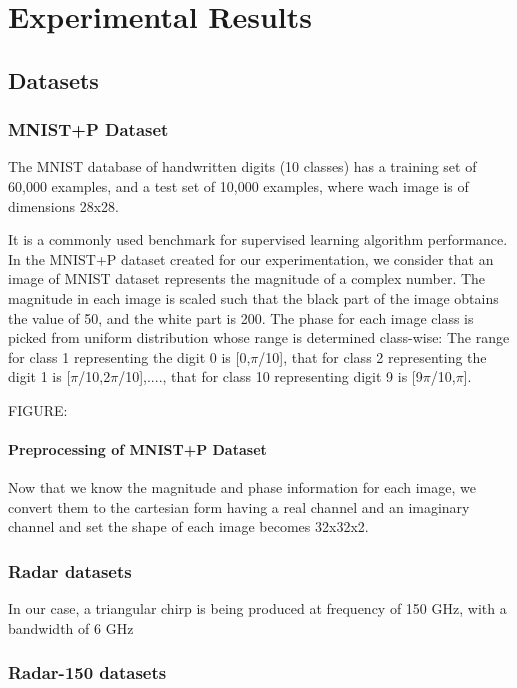 \chapter{Experimental Results} \label{chap:meth}



\section{Datasets}\label{datasets}


\subsection{MNIST+P Dataset}\label{data-mnistp}
The MNIST database of handwritten digits (10 classes) has a training set of 60,000 examples, and a test set of 10,000 examples, where wach image is of dimensions 28x28. 


It is a commonly used benchmark for supervised learning algorithm performance. In the MNIST+P dataset created for our experimentation, we consider that an image of MNIST dataset represents the magnitude of a complex number. The magnitude in each image is scaled such that the black part of the image obtains the value of 50, and the white part is 200. The phase for each image class is picked from uniform distribution whose range is determined class-wise: The range for class 1 representing the digit 0 is [0,$\pi$/10], that for class 2 representing the digit 1 is [$\pi$/10,2$\pi$/10],...., that for class 10 representing digit 9 is [9$\pi$/10,$\pi$]. 

FIGURE:

\subsubsection{Preprocessing of MNIST+P Dataset}
Now that we know the magnitude and phase information for each image, we convert them to the cartesian form having a real channel and an imaginary channel and set the shape of each image becomes 32x32x2.





\subsection{Radar datasets}\label{data-radar}
   In our case, a triangular chirp is being produced at frequency of 150 GHz, with a bandwidth of 6 GHz
\subsection{Radar-150 datasets}
